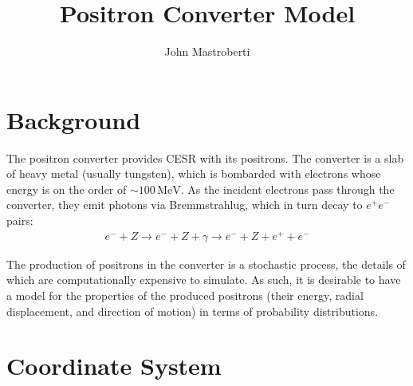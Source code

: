 \documentclass[12pt]{article}
\newcommand{\MeV}{\, \mathrm{MeV}}
\begin{document}
\title{Positron Converter Model}
\author{John Mastroberti}

\maketitle

\section*{Background}

The positron converter provides CESR with its positrons.
The converter is a slab of heavy metal (usually tungsten), which is bombarded with electrons whose energy is on the order of $\sim 100 \MeV$.
As the incident electrons pass through the converter, they emit photons via Bremmstrahlug, which in turn decay to $e^+ e^-$ pairs:
\begin{align*}
e^- + Z \rightarrow e^- + Z + \gamma \rightarrow e^- + Z + e^+ + e^-
\end{align*}

The production of positrons in the converter is a stochastic process, the details of which are computationally expensive to simulate.
As such, it is desirable to have a model for the properties of the produced positrons (their energy, radial displacement, and direction of motion) in terms of probability distributions.

\section*{Coordinate System}
\end{document}
